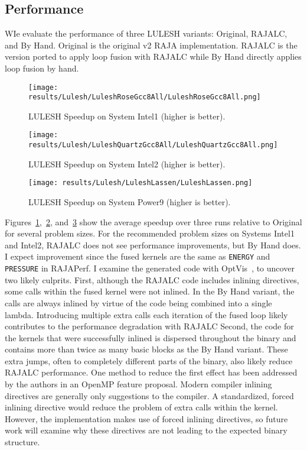 \subsection{Performance}

WIe evaluate the performance of three LULESH variants: Original, RAJALC, and
By Hand.
Original is the original v2 RAJA implementation.
RAJALC is the version ported to apply loop fusion with RAJALC while By Hand
directly applies loop fusion by hand.


\begin{figure}[t]
\texttt{[image: results/Lulesh/LuleshRoseGcc8All/LuleshRoseGcc8All.png]}
\caption{LULESH Speedup on System Intel1 (higher is better).}\label{LULESHRose}
\end{figure}

\begin{figure}[t]
\texttt{[image: results/Lulesh/LuleshQuartzGcc8All/LuleshQuartzGcc8All.png]}
\caption{LULESH Speedup on System Intel2 (higher is better).}\label{LULESHQuartz}
\end{figure}

\begin{figure}[t]
\texttt{[image: results/Lulesh/LuleshLassen/LuleshLassen.png]}
\caption{LULESH Speedup on System Power9 (higher is better).}\label{LULESHLassen}
\end{figure}

Figures~\ref{LULESHRose},~\ref{LULESHQuartz}, and~\ref{LULESHLassen} show
the average speedup over three runs relative to Original for several problem
sizes. 
For the recommended problem sizes on Systems Intel1 and Intel2, RAJALC does
not see performance improvements, but By Hand does.
I expect improvement since the fused kernels are the same as \verb.ENERGY.
and \verb.PRESSURE. in RAJAPerf.
I examine the generated code with OptVis~\cite{devkota2020ccnav}, to uncover
two likely culprits.
First, although the RAJALC code includes inlining directives, some calls
within the fused kernel were not inlined. 
In the By Hand variant, the calls are always inlined by virtue of the code
being combined into a single lambda. 
Introducing multiple extra calls each iteration of the fused loop likely
contributes to the performance degradation with RAJALC\@
Second, the code for the kernels that were successfully inlined is dispersed
throughout the binary and contains more than twice as many basic blocks as
the By Hand variant. 
These extra jumps, often to completely different parts of the binary, also
likely reduce RAJALC performance. 
One method to reduce the first effect has been addressed by the authors 
in an OpenMP feature proposal. Modern compiler inlining directives are generally 
only suggestions to the compiler. A standardized, forced inlining directive would 
reduce the problem of extra calls within the kernel.
However, the implementation makes use of forced inlining directives, 
so future work will examine why these directives are not leading to the expected binary structure.

